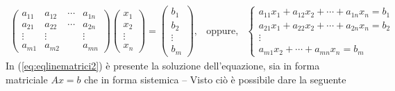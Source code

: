 \documentclass{book}
\theoremstyle{definition}
\theoremstyle{plain}
\begin{document}
\begin{eqnarray}
  \label{eq:eqlinematrici2}
  \begin{pmatrix}
    a_{11} & a_{12} & \cdots & a_{1n}\\
    a_{21} & a_{22} & \cdots & a_{2n}\\
    \vdots & \vdots & & \vdots\\
    a_{m1} &a_{m2} & &a_{mn}
  \end{pmatrix}
  \begin{pmatrix}
    x_1\\
    x_2\\
    \vdots\\
    x_n
  \end{pmatrix}=
  \begin{pmatrix}
    b_1\\
    b_2\\
    \vdots\\
    b_m
  \end{pmatrix}, & \text{oppure,} &
                  \begin{cases}
                    a_{11}x_1 + a_{12}x_2+\cdots+a_{1n}x_n=b_1\\
                    a_{21}x_1+a_{22}x_2+\cdots+a_{2n}x_n=b_2\\
                    \vdots\\
                    a_{m1}x_2+\cdots+a_{mn}x_n=b_m
                  \end{cases}
\end{eqnarray}
In (\ref{eq:eqlinematrici2}) è presente la soluzione dell'equazione,
sia in forma matriciale $Ax=b$ che in forma sistemica -- Visto ciò è
possibile dare la seguente
\end{document}
